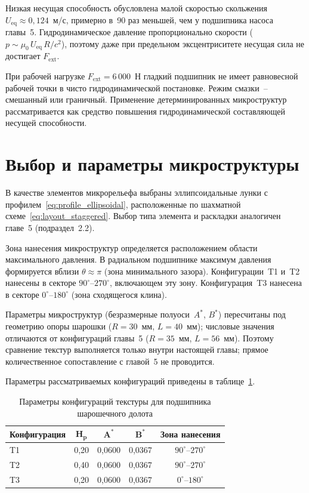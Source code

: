 Низкая несущая способность обусловлена малой скоростью скольжения
$U_{\mathrm{eq}} \approx 0{,}124$~м/с, примерно в~90 раз меньшей,
чем у подшипника насоса главы~5. Гидродинамическое давление
пропорционально скорости ($p \sim \mu_0\, U_{\mathrm{eq}}\, R / c^2$), поэтому даже
при предельном эксцентриситете несущая сила не достигает
$F_{\mathrm{ext}}$.

При рабочей нагрузке $F_{\mathrm{ext}} = 6\,000$~Н гладкий
подшипник не имеет равновесной рабочей точки в чисто
гидродинамической постановке. Режим смазки~-- смешанный или
граничный. Применение детерминированных микроструктур
рассматривается как средство повышения гидродинамической
составляющей несущей способности.


\section{Выбор и параметры микроструктуры}

В качестве элементов микрорельефа выбраны эллипсоидальные лунки
с профилем~\eqref{eq:profile_ellipsoidal}, расположенные
по шахматной схеме~\eqref{eq:layout_staggered}. Выбор типа
элемента и раскладки аналогичен главе~5 (подраздел~2.2).

Зона нанесения микроструктур определяется расположением области
максимального давления. В радиальном подшипнике максимум давления
формируется вблизи $\theta \approx \pi$ (зона минимального зазора).
Конфигурации~T1 и~T2 нанесены в секторе
$90^{\circ}$--$270^{\circ}$, включающем эту зону. Конфигурация~T3
нанесена в секторе $0^{\circ}$--$180^{\circ}$ (зона сходящегося
клина).

Параметры микроструктур (безразмерные полуоси~$A^*$, $B^*$)
пересчитаны под геометрию опоры шарошки ($R = 30$~мм,
$L = 40$~мм); числовые значения отличаются от конфигураций
главы~5 ($R = 35$~мм, $L = 56$~мм). Поэтому сравнение текстур
выполняется только внутри настоящей главы; прямое количественное
сопоставление с главой~5 не проводится.

Параметры рассматриваемых конфигураций приведены в
таблице~\ref{tab:bit_texture_configs}.

\begin{table}[!ht]
\centering
\caption{Параметры конфигураций текстуры для подшипника шарошечного долота}
\label{tab:bit_texture_configs}
\begin{tabularx}{\textwidth}{|X|c|c|c|c|}
\hline
\multicolumn{1}{|c|}{\textbf{Конфигурация}} & $\boldsymbol{H_p}$ & $\boldsymbol{A^*}$ & $\boldsymbol{B^*}$ & \textbf{Зона нанесения} \\
\hline
T1 & 0{,}20 & 0{,}0600 & 0{,}0367 & $90^{\circ}$--$270^{\circ}$ \\
\hline
T2 & 0{,}40 & 0{,}0600 & 0{,}0367 & $90^{\circ}$--$270^{\circ}$ \\
\hline
T3 & 0{,}20 & 0{,}0600 & 0{,}0367 & $0^{\circ}$--$180^{\circ}$ \\
\hline
\end{tabularx}
\end{table}


